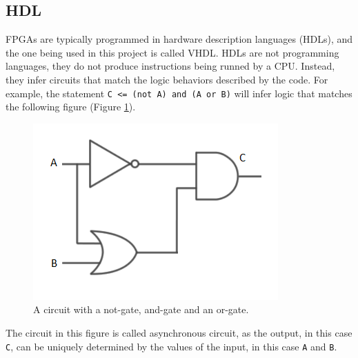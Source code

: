 \documentclass{article}
\begin{document}
	\subsection{HDL}
		FPGAs are typically programmed in hardware description languages (HDLs), and the one being used in this project is called VHDL. HDLs are not programming languages, they do not produce instructions being runned by a CPU. Instead, they infer circuits that match the logic behaviors described by the code. For example, the statement \texttt{C <= (not A) and (A or B)} will infer logic that matches the following figure (Figure \ref{fig:circuit1}).
	\begin{figure}[h]
		\centering
		\includegraphics[scale=0.6]{circuit1}
		\caption{A circuit with a not-gate, and-gate and an or-gate.}
		\label{fig:circuit1}
	\end{figure}
	The circuit in this figure is called asynchronous circuit, as the output, in this case \texttt{C}, can be uniquely determined by the values of the input, in this case \texttt{A} and \texttt{B}. 
	\\
		
\end{document}
